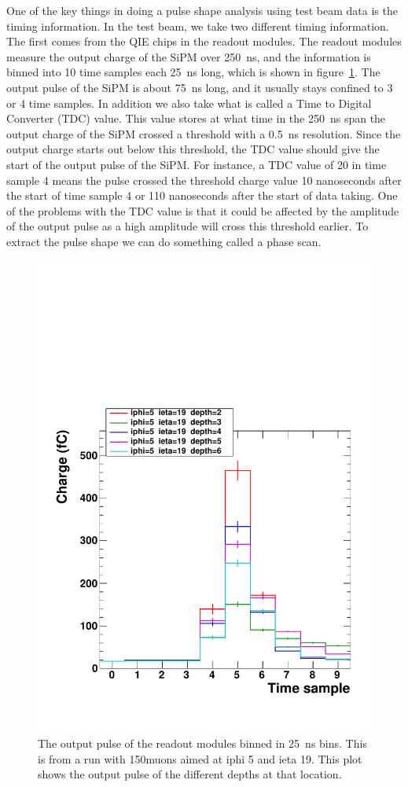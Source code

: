One of the key things in doing a pulse shape analysis using test beam data is the timing information. In the test beam, we take two different timing information. The first comes from the QIE chips in the readout modules. The readout modules measure the output charge of the SiPM over 250~ns, and the information is binned into 10 time samples each 25~ns long, which is shown in figure~\ref{fig:PulSh}. The output pulse of the SiPM is about 75~ns long, and it usually stays confined to 3 or 4 time samples. In addition we also take what is called a Time to Digital Converter (TDC) value. This value stores at what time in the 250~ns span the output charge of the SiPM crossed a threshold with a 0.5~ns resolution. Since the output charge starts out below this threshold, the TDC value should give the start of the output pulse of the SiPM. For instance, a TDC value of 20 in time sample 4 means the pulse crossed the threshold charge value 10 nanoseconds after the start of time sample 4 or 110 nanoseconds after the start of data taking. One of the problems with the TDC value is that it could be affected by the amplitude of the output pulse as a high amplitude will cross this threshold earlier. To extract the pulse shape we can do something called a phase scan. 

\begin{figure}
\centering
\includegraphics[width=0.6\linewidth]{Figures/Pulse.pdf}
\caption{The output pulse of the readout modules binned in 25~ns bins. This is from a run with 150\GeV\space muons aimed at iphi 5 and ieta 19. This plot shows the output pulse of the different depths at that location.}
\label{fig:PulSh}
\end{figure}

